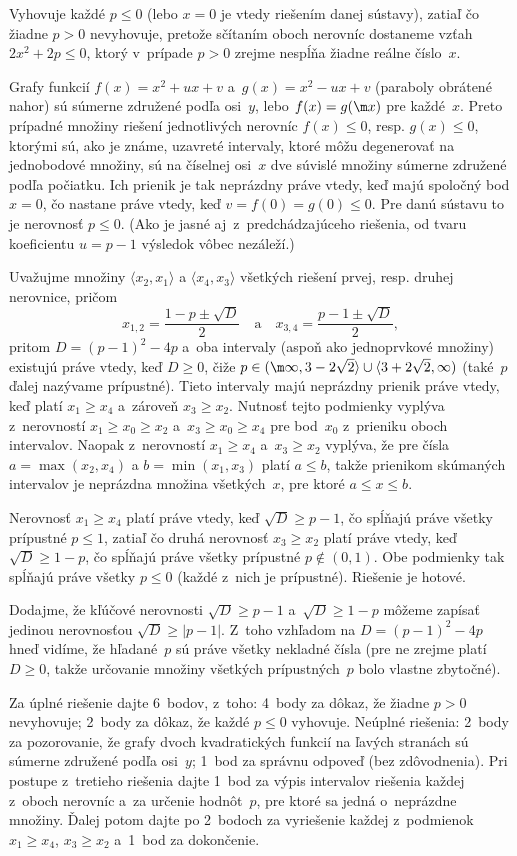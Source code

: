 {%
Vyhovuje každé $p\le0$ (lebo $x=0$ je vtedy riešením
danej sústavy),
zatiaľ čo žiadne $p>0$ nevyhovuje, pretože sčítaním oboch nerovníc
dostaneme vzťah $2x^2+2p\le0$, ktorý v~prípade $p>0$
zrejme nespĺňa žiadne reálne číslo~$x$.

\ineres
Grafy funkcií $f(x)=x^2+ux+v$ a~$g(x)=x^2-ux+v$
(paraboly obrátené nahor) sú súmerne združené podľa osi~$y$,
lebo $f(x)=g(\m x)$ pre každé~$x$. Preto prípadné množiny riešení
jednotlivých nerovníc $f(x)\le0$, resp. $g(x)\le0$, ktorými
sú, ako je známe, uzavreté intervaly, ktoré môžu degenerovať
na jednobodové množiny, sú na číselnej osi~$x$ dve súvislé
množiny súmerne združené
podľa počiatku. Ich prienik je tak neprázdny práve vtedy, keď majú
spoločný bod $x=0$, čo nastane práve vtedy, keď $v=f(0)=g(0)\le0$.
Pre danú sústavu to je nerovnosť $p\le0$.
(Ako je jasné aj~z~predchádzajúceho riešenia, od tvaru
koeficientu $u=p-1$ výsledok vôbec nezáleží.)

\ineres
Uvažujme množiny $\langle x_2,x_1\rangle$ a $\langle x_4,x_3\rangle$
všetkých riešení prvej, resp. druhej nerovnice, pričom
$$
x_{1,2}=\frac{1-p\pm\sqrt{D}}{2}\quad\text{a}\quad
x_{3,4}=\frac{p-1\pm\sqrt{D}}{2},
$$
pritom $D=(p-1)^2-4p$ a~oba intervaly (aspoň ako jednoprvkové
množiny) existujú práve vtedy, keď $D\ge0$, čiže
$p\in({\m\infty},3-2\sqrt2\rangle\cup\langle3+2\sqrt2,\infty)$
(také~$p$ ďalej nazývame prípustné).
Tieto intervaly majú neprázdny prienik práve vtedy,
keď platí $x_1\ge x_4$ a~zároveň $x_3\ge x_2$.
Nutnosť tejto podmienky vyplýva z~nerovností $x_1\ge x_0\ge x_2$ a~$x_3\ge x_0\ge x_4$
pre bod~$x_0$ z~prieniku oboch intervalov. Naopak z~nerovností $x_1\ge x_4$ a~$x_3\ge x_2$
vyplýva, že pre čísla $a=\max(x_2,x_4)$ a $b=\min(x_1,x_3)$ platí $a\le b$,
takže prienikom skúmaných intervalov je neprázdna množina všetkých~$x$, pre ktoré $a\le x\le b$.

Nerovnosť $x_1\ge x_4$ platí práve vtedy, keď
$\sqrt{D}\ge p-1$, čo spĺňajú práve všetky prípustné $p\le1$,
zatiaľ čo druhá nerovnosť $x_3\ge x_2$ platí práve vtedy, keď
$\sqrt{D}\ge 1-p$, čo spĺňajú práve všetky prípustné
$p\notin(0,1)$. Obe podmienky tak spĺňajú práve všetky $p\le0$
(každé z~nich je prípustné). Riešenie je hotové.

Dodajme, že kľúčové nerovnosti $\sqrt{D}\ge p-1$ a~$\sqrt{D}\ge 1-p$
môžeme zapísať jedinou nerovnosťou $\sqrt{D}\ge|p-1|$. Z~toho
vzhľadom na $D=(p-1)^2-4p$ hneď vidíme, že hľadané~$p$ sú práve
všetky nekladné čísla (pre ne zrejme platí $D\ge0$, takže
určovanie množiny všetkých prípustných~$p$ bolo vlastne zbytočné).



\nobreak\medskip\petit\noindent
Za úplné riešenie dajte 6~bodov, z~toho:
4~body za dôkaz, že žiadne $p>0$ nevyhovuje;
2~body za dôkaz, že každé $p\le 0$ vyhovuje.
Neúplné riešenia:
2~body za pozorovanie, že grafy dvoch kvadratických funkcií na ľavých
stranách sú súmerne združené podľa osi~$y$; 1~bod za správnu
odpoveď (bez zdôvodnenia).
Pri postupe z~tretieho riešenia dajte 1~bod za výpis intervalov riešenia každej z~oboch nerovníc
a~za určenie hodnôt~$p$, pre ktoré sa jedná o~neprázdne množiny. Ďalej potom dajte po 2~bodoch
za vyriešenie každej z~podmienok $x_1\ge x_4$, $x_3\ge x_2$ a~1~bod za dokončenie.
\endpetit
\bigbreak
}

